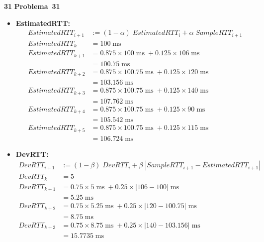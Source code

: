 \documentclass{article}
\newcounter{exe-list}
\newenvironment{exe}[2][Problema]
    {\newcommand{\opt}{(Opcional)}%
    \newcommand{\sketch}[1]{{\bfseries Rascunho:} ##1}%
    \medskip\par\noindent\ifthenelse{\equal{#1}{}}
        {\textbf{\large #2}}
        {\textbf{\large #1~#2}}%
    \medskip\par\noindent}
    {\medskip}
\DeclareMathOperator{\ms}{ms}
\begin{document}
\begin{exe}{31}
    \begin{itemize}
        \item \textbf{EstimatedRTT:}
            \begin{align*}
                EstimatedRTT_{i+1} &:= (1 - \alpha) \; EstimatedRTT_i
                    + \alpha \; SampleRTT_{i+1} \\
                EstimatedRTT_k &= 100 \ms \\
                EstimatedRTT_{k+1} &= 0.875 \times 100 \ms
                    + 0.125 \times 106 \ms \\
                &= 100.75 \ms \\
                EstimatedRTT_{k+2} &= 0.875 \times 100.75 \ms
                    + 0.125 \times 120 \ms \\
                &= 103.156 \ms \\
                EstimatedRTT_{k+3} &= 0.875 \times 100.75 \ms
                    + 0.125 \times 140 \ms \\
                &= 107.762 \ms \\
                EstimatedRTT_{k+4} &= 0.875 \times 100.75 \ms
                    + 0.125 \times 90 \ms \\
                &= 105.542 \ms \\
                EstimatedRTT_{k+5} &= 0.875 \times 100.75 \ms
                    + 0.125 \times 115 \ms \\
                &= 106.724 \ms
            \end{align*}
        \item \textbf{DevRTT:}
            \begin{align*}
                DevRTT_{i+1} &:= (1 - \beta) \; DevRTT_i
                    + \beta \; |SampleRTT_{i+1} - EstimatedRTT_{i+1}| \\
                DevRTT_k &= 5 \\
                DevRTT_{k+1} &= 0.75 \times 5 \ms
                    + 0.25 \times |106 - 100| \ms \\
                &= 5.25 \ms \\
                DevRTT_{k+2} &= 0.75 \times 5.25 \ms
                    + 0.25 \times |120 - 100.75| \ms \\
                &= 8.75 \ms \\
                DevRTT_{k+3} &= 0.75 \times 8.75 \ms
                    + 0.25 \times |140 - 103.156| \ms \\
                &= 15.7735 \ms \\

\end{align*}
\end{itemize}
\end{exe}
\end{document}
